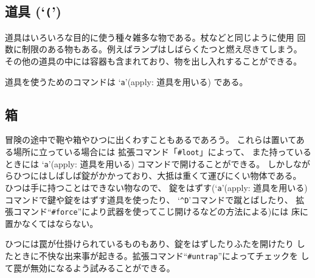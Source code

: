 \subsection*{道具 (`{\tt (}')}

道具はいろいろな目的に使う種々雑多な物である。杖などと同じように使用
回数に制限のある物もある。例えばランプはしばらくたつと燃え尽きてしまう。
その他の道具の中には容器も含まれており、物を出し入れすることができる。

道具を使うためのコマンドは `{\tt a}'(apply: 道具を用いる) である。

\subsection*{箱}

冒険の途中で鞄や箱やひつに出くわすこともあるであろう。
これらは置いてある場所に立っている場合には
拡張コマンド「{\tt \#loot}」によって、
また持っているときには `{\tt a}'(apply: 道具を用いる) コマンドで開けることができる。
しかしながらひつにはしばしば錠がかかっており、大抵は重くて運びにくい物体である。
ひつは手に持つことはできない物なので、
錠をはずす(`{\tt a}'(apply: 道具を用いる) コマンドで鍵や錠をはずす道具を使ったり、
`{\tt \^{}D}'コマンドで蹴とばしたり、
拡張コマンド``{\tt \#force}''により武器を使ってこじ開けるなどの方法による)には
床に置かなくてはならない。

ひつには罠が仕掛けられているものもあり、錠をはずしたりふたを開けたり
したときに不快な出来事が起きる。拡張コマンド``{\tt \#untrap}''によってチェックを
して罠が無効になるよう試みることができる。

